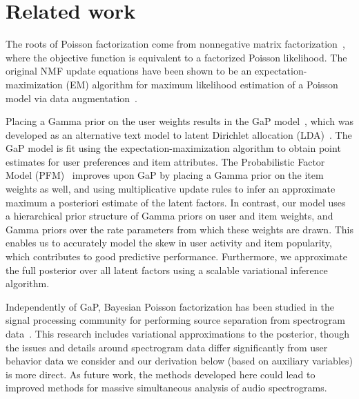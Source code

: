 \section{Related work}
The roots of Poisson factorization come from nonnegative matrix
factorization~\cite{Lee:1999}, where the objective function is
equivalent to a factorized Poisson likelihood.  The original NMF
update equations have been shown to be an expectation-maximization
(EM) algorithm for maximum likelihood estimation of a Poisson model
via data augmentation~\cite{Cemgil:2009}.

Placing a Gamma prior on the user weights results in the GaP
model~\cite{Canny:2004}, which was developed as an alternative text
model to latent Dirichlet allocation
(LDA)~\cite{Blei:2003b,Inouye:2014}. The GaP model is fit using the
expectation-maximization algorithm to obtain point estimates for user
preferences and item attributes. The Probabilistic Factor Model
(PFM)~\cite{Ma:2011} improves upon GaP by placing a Gamma prior on the
item weights as well, and using multiplicative update rules to infer
an approximate maximum a posteriori estimate of the latent factors.
In contrast, our model uses a hierarchical prior structure of Gamma
priors on user and item weights, and Gamma priors over the rate
parameters from which these weights are drawn. This enables us to
accurately model the skew in user activity and item popularity, which
contributes to good predictive performance. Furthermore, we
approximate the full posterior over all latent factors using a
scalable variational inference algorithm.



Independently of GaP, Bayesian Poisson factorization has been studied
in the signal processing community for performing source separation
from spectrogram data~\cite{Cemgil:2009,Hoffman:2012}.  This research
includes variational approximations to the posterior, though the
issues and details around spectrogram data differ significantly from
user behavior data we consider and our derivation below (based on
auxiliary variables) is more direct.  As future work, the methods
developed here could lead to improved methods for massive simultaneous
analysis of audio spectrograms.

